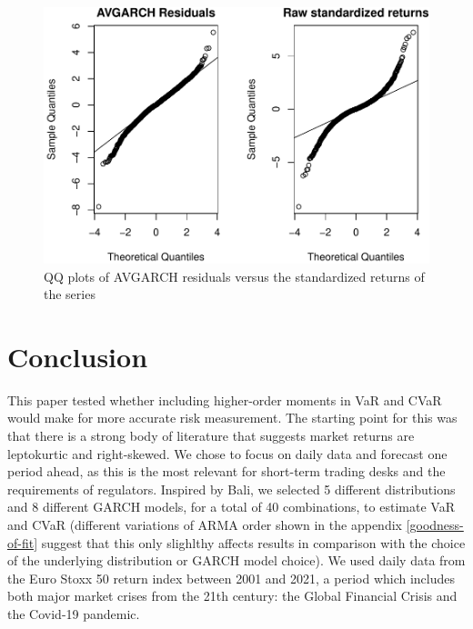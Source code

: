 \documentclass[a4paper, nobind]{templates/ociamthesis}
\begin{document}
\begin{figure}[h]

{\centering \includegraphics[width=1\linewidth]{_main_files/figure-latex/figuresqq-1} 

}

\caption{QQ plots of AVGARCH residuals versus the standardized returns of the series}\label{fig:figuresqq}
\end{figure}

\hypertarget{Conclusion}{%
\chapter{Conclusion}\label{Conclusion}}

This paper tested whether including higher-order moments in VaR and CVaR would make for more accurate risk measurement. The starting point for this was that there is a strong body of literature that suggests market returns are leptokurtic and right-skewed. We chose to focus on daily data and forecast one period ahead, as this is the most relevant for short-term trading desks and the requirements of regulators. Inspired by Bali, we selected 5 different distributions and 8 different GARCH models, for a total of 40 combinations, to estimate VaR and CVaR (different variations of ARMA order shown in the appendix \ref{goodness-of-fit} suggest that this only slighlthy affects results in comparison with the choice of the underlying distribution or GARCH model choice). We used daily data from the Euro Stoxx 50 return index between 2001 and 2021, a period which includes both major market crises from the 21th century: the Global Financial Crisis and the Covid-19 pandemic. ~\\
\end{document}
